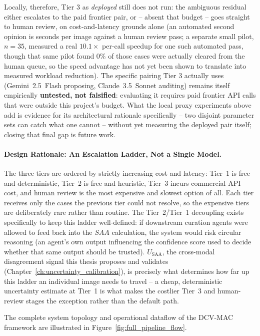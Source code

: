 \documentclass[12pt,a4paper]{report}
\begin{document}
\begin{itemize}
    Locally, therefore, Tier 3 as \emph{deployed} still does not run: the ambiguous residual either escalates to the paid frontier pair, or -- absent that budget -- goes straight to human review, on cost-and-latency grounds alone (an automated second opinion is seconds per image against a human review pass; a separate small pilot, $n=35$, measured a real $10.1\times$ per-call speedup for one such automated pass, though that same pilot found $0\%$ of those cases were actually cleared from the human queue, so the speed advantage has not yet been shown to translate into measured workload reduction). The specific pairing Tier 3 actually uses (Gemini~2.5~Flash proposing, Claude~3.5~Sonnet auditing) remains itself empirically \textbf{untested, not falsified}: evaluating it requires paid frontier API calls that were outside this project's budget. What the local proxy experiments above add is evidence for its architectural rationale specifically -- two disjoint parameter sets can catch what one cannot -- without yet measuring the deployed pair itself; closing that final gap is future work.
\end{itemize}

\paragraph{Design Rationale: An Escalation Ladder, Not a Single Model.} The three tiers are ordered by strictly increasing cost and latency: Tier~1 is free and deterministic, Tier~2 is free and heuristic, Tier~3 incurs commercial API cost, and human review is the most expensive and slowest option of all. Each tier receives only the cases the previous tier could not resolve, so the expensive tiers are deliberately rare rather than routine. The Tier~2/Tier~1 decoupling exists specifically to keep this ladder well-defined: if downstream curation agents were allowed to feed back into the $SAA$ calculation, the system would risk circular reasoning (an agent's own output influencing the confidence score used to decide whether that same output should be trusted). $U_{\text{SAA}}$, the cross-modal disagreement signal this thesis proposes and validates (Chapter~\ref{ch:uncertainty_calibration}), is precisely what determines how far up this ladder an individual image needs to travel -- a cheap, deterministic uncertainty estimate at Tier~1 is what makes the costlier Tier~3 and human-review stages the exception rather than the default path.

The complete system topology and operational dataflow of the DCV-MAC framework are illustrated in Figure~\ref{fig:full_pipeline_flow}.
\end{document}
